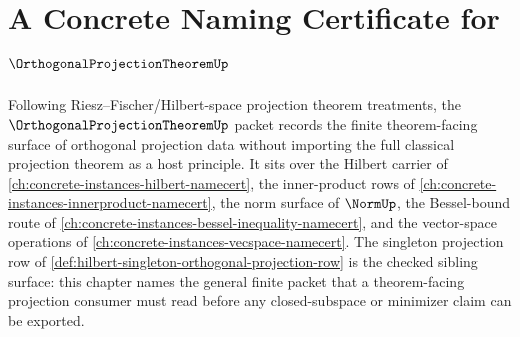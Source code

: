 \chapter{A Concrete Naming Certificate for $\OrthogonalProjectionTheoremUp$}
\label{ch:concrete-instances-orthogonal-projection-theorem-namecert}

Following Riesz--Fischer/Hilbert-space projection theorem treatments, the $\OrthogonalProjectionTheoremUp$ packet records the finite theorem-facing surface of orthogonal projection data without importing the full classical projection theorem as a host principle. It sits over the Hilbert carrier of \autoref{ch:concrete-instances-hilbert-namecert}, the inner-product rows of \autoref{ch:concrete-instances-innerproduct-namecert}, the norm surface of $\NormUp$, the Bessel-bound route of \autoref{ch:concrete-instances-bessel-inequality-namecert}, and the vector-space operations of \autoref{ch:concrete-instances-vecspace-namecert}. The singleton projection row of \autoref{def:hilbert-singleton-orthogonal-projection-row} is the checked sibling surface: this chapter names the general finite packet that a theorem-facing projection consumer must read before any closed-subspace or minimizer claim can be exported.

